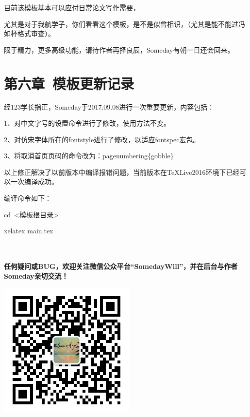 \documentclass{ctexart}
\begin{document}
目前该模板基本可以应付日常论文写作需要，\par
尤其是对于我航学子，你们看看这个模板，是不是似曾相识，（尤其是能不能过冯如杯格式审查）。\par
限于精力，更多高级功能，请待作者再择良辰，Someday有朝一日还会回来。

\section{第六章\ 模板更新记录}

经123学长指正，Someday于2017.09.08进行一次重要更新，内容包括：\par
1、对中文字号的设置命令进行了修改，使用方法不变。\par
2、对仿宋字体所在的fontstyle进行了修改，以适应fontspec宏包。\par
3、将取消首页页码的命令改为：pagenumbering\{gobble\} \par

以上修正解决了以前版本中编译报错问题，当前版本在TeXLive2016环境下已经可以一次编译成功。 \par

编译命令如下： \par
cd\ <模板根目录> \par
xelatex main.tex \par

\ \\
\ \\

\textbf{任何疑问或BUG，欢迎关注微信公众平台“SomedayWill”，并在后台与作者Someday亲切交流！}

\begin{center}
\includegraphics[scale=0.7]{SomedayWill_QR_code.jpg}
\end{center}


\end{document}
